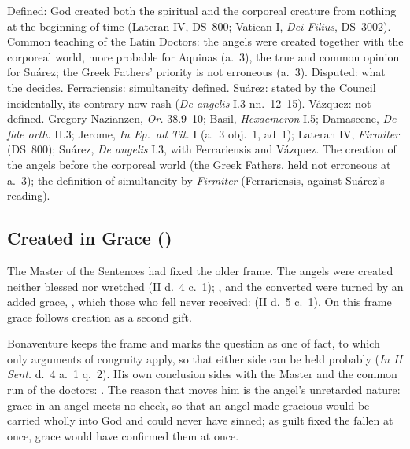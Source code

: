  {Defined: God created both the spiritual and the corporeal creature
  from nothing at the beginning of time (Lateran IV, DS~800; Vatican I,
  \emph{Dei Filius}, DS~3002). Common teaching of the Latin Doctors: the
  angels were created together with the corporeal world, more probable
  for Aquinas (a.~3), the true and common opinion for Suárez; the Greek
  Fathers' priority is not erroneous (a.~3). Disputed: what the
   decides. Ferrariensis: simultaneity defined. Suárez:
  stated by the Council incidentally, its contrary now rash (\emph{De
  angelis} I.3 nn.~12--15). Vázquez: not defined.}
 {Gregory Nazianzen, \emph{Or.} 38.9--10; Basil, \emph{Hexaemeron}
  I.5; Damascene, \emph{De fide orth.} II.3; Jerome, \emph{In Ep.\ ad
  Tit.} I (a.~3 obj.~1, ad~1); Lateran IV, \emph{Firmiter} (DS~800);
  Suárez, \emph{De angelis} I.3, with Ferrariensis and Vázquez.}
 {The creation of the angels before the corporeal world (the Greek
  Fathers, held not erroneous at a.~3); the definition of simultaneity by
  \emph{Firmiter} (Ferrariensis, against Suárez's reading).}

\subsection{Created in Grace ()}\label{sec:dq-grace}

The Master of the Sentences had fixed the older frame. The angels were
created neither blessed nor wretched (II d.~4 c.~1); , and the converted were turned by an added grace, , which those who fell never received:  (II d.~5 c.~1). On this frame grace follows
creation as a second gift.

Bonaventure keeps the frame and marks the question as one of fact, to
which only arguments of congruity apply, so that either side can be held
probably (\emph{In II Sent.} d.~4 a.~1 q.~2). His own conclusion sides
with the Master and the common run of the doctors: . The reason that moves him is the angel's unretarded
nature: grace in an angel meets no check, so that an angel made gracious
would be carried wholly into God and could never have sinned; as guilt
fixed the fallen at once, grace would have confirmed them at once.

